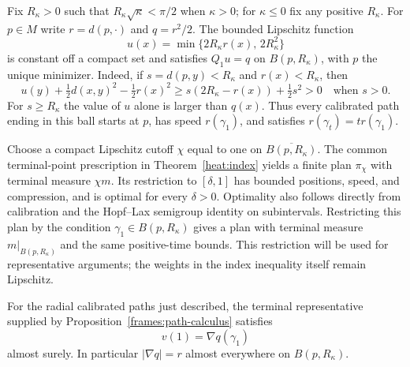 Fix $R_\kappa>0$ such that $R_\kappa\sqrt\kappa<\pi/2$ when
$\kappa>0$; for $\kappa\leq0$ fix any positive $R_\kappa$.
For $p\in M$ write $r=d(p,\cdot)$ and $q=r^2/2$.
The bounded Lipschitz function
\begin{equation}\label{frames:radial-data}
 u(x)=\min\{2R_\kappa r(x),\,2R_\kappa^2\}
\end{equation}
is constant off a compact set and satisfies $Q_1u=q$ on
$B(p,R_\kappa)$, with $p$ the unique minimizer.
Indeed, if $s=d(p,y)<R_\kappa$ and $r(x)<R_\kappa$, then
\[
 u(y)+\tfrac12d(x,y)^2-\tfrac12r(x)^2
       \geq s(2R_\kappa-r(x))+\tfrac12s^2>0
       \quad\text{when }s>0.
\]
For $s\geq R_\kappa$ the value of $u$ alone is larger than
$q(x)$.  Thus every calibrated path ending in this ball starts
at $p$, has speed $r(\gamma_1)$, and satisfies
$r(\gamma_t)=t r(\gamma_1)$.

Choose a compact Lipschitz cutoff $\chi$ equal to one on
$\overline{B(p,R_\kappa)}$.  The common terminal-point
prescription in Theorem~\ref{heat:index} yields a finite plan
$\pi_\chi$ with terminal measure $\chi m$.
Its restriction to $[\delta,1]$ has bounded positions, speed,
and compression, and is optimal for every $\delta>0$.
Optimality also follows directly from calibration and the
Hopf--Lax semigroup identity on subintervals.
Restricting this plan by the condition
$\gamma_1\in B(p,R_\kappa)$ gives a plan with terminal measure
$m|_{B(p,R_\kappa)}$ and the same positive-time bounds.
This restriction will be used for representative arguments;
the weights in the index inequality itself remain Lipschitz.

\begin{lemma}\label{frames:terminal-trace}
 For the radial calibrated paths just described, the terminal
 representative supplied by Proposition~\ref{frames:path-calculus}
 satisfies
 \begin{equation}\label{frames:terminal-identity}
  v(1)=\nabla q(\gamma_1)
 \end{equation}
 almost surely.  In particular $|\nabla q|=r$ almost everywhere
 on $B(p,R_\kappa)$.
\end{lemma}

